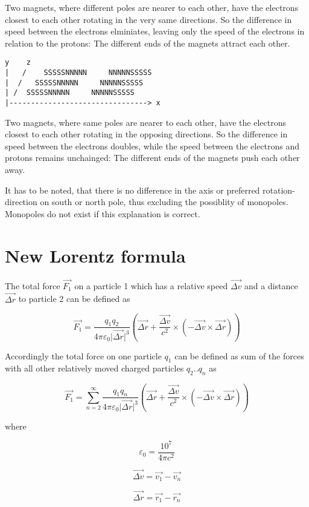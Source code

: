 \documentclass[12pt,a4paper,twocolumn]{article}
\begin{document}
Two magnets, where different poles are nearer to each other, have the electrons closest to each other rotating in the very same directions. So the difference in speed between the electrons elminiates, leaving only the speed of the electrons in relation to the protons: The different ends of the magnets attract each other.

\begin{verbatim}
y    z
|   /    SSSSSNNNNN     NNNNNSSSSS
|  /   SSSSSNNNNN     NNNNNSSSSS
| /  SSSSSNNNNN     NNNNNSSSSS
|--------------------------------> x
\end{verbatim}

Two magnets, where same poles are nearer to each other, have the electrons closest to each other rotating in the opposing directions. So the difference in speed between the electrons doubles, while the speed between the electrons and protons remains unchainged: The different ends of the magnets push each other away.

It has to be noted, that there is no difference in the axis or preferred rotation-direction on south or north pole, thus excluding the possiblity of monopoles. Monopoles do not exist if this explanation is correct.

\section{New Lorentz formula}

The total force $\vec{F_1}$ on a particle 1 which has a relative speed $\vec{\Delta v}$ and a distance $\vec{\Delta r}$ to particle 2 can be defined as 

$$\vec{F_1}= \frac{q_1 q_2}{4\pi\varepsilon_0 \vert \vec{\Delta r} \vert^3} ( \vec{\Delta r} + \frac{\vec{\Delta v}}{c^2} \times (-\vec{\Delta v} \times \vec{\Delta r}))$$

Accordingly the total force on one particle $q_1$ can be defined as sum of the forces with all other relatively moved charged particles $q_2 .. q_n$ as 

$$\vec{F_1}= \sum_{n=2}^{\infty} \frac{q_1 q_n}{4\pi\varepsilon_0 \vert \vec{\Delta r} \vert^3} ( \vec{\Delta r} + \frac{\vec{\Delta v}}{c^2} \times (-\vec{\Delta v} \times \vec{\Delta r}))$$

where

$$\varepsilon_0 = \frac{10^7}{4 \pi c^2}$$

$$\vec{\Delta v} = \vec{v_1} - \vec{v_n}$$

$$\vec{\Delta r} = \vec{r_1} - \vec{r_n}$$
\end{document}

